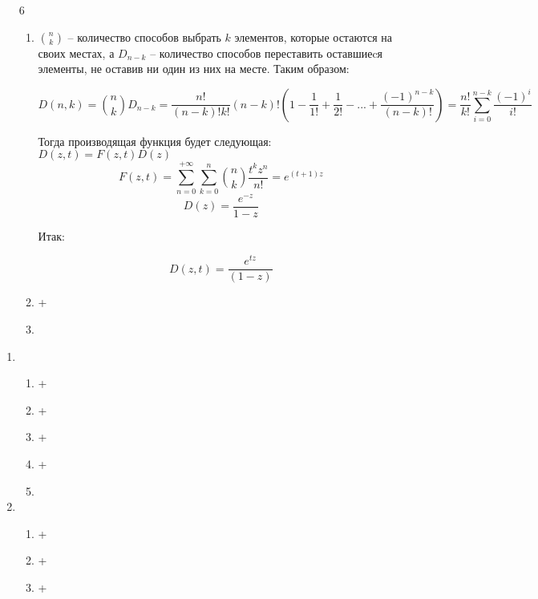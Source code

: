 \begin{enumerate}
  \item[6]
    \begin{enumerate}
      \item
      $ {n \choose k} $ -- количество способов выбрать $k$ элементов, которые остаются на своих местах, а $D_{n-k}$ -- количество способов переставить оставшиеcя элементы, не оставив ни один из них на месте. Таким образом:
      
      $$
D(n,k) = {n \choose k} D_{n-k} = \frac{n!}{(n-k)!k!} (n-k)! \left( 1 - \frac{1}{1!} + \frac{1}{2!} - ... + \frac{(-1)^{n-k}}{(n-k)!} \right) = \frac{n!}{k!} \sum\limits_{i=0}^{n-k} \frac{(-1)^i}{i!}
      $$
      
Тогда производящая функция будет следующая: $D(z,t) = F(z,t)D(z)$
$$F(z,t) = \sum\limits_{n=0}^{+\infty} \sum\limits_{k=0}^{n} {n \choose k} \frac{t^k z^n}{n!} = e^{(t+1)z}$$
$$ D(z) = \frac{e^{-z}}{1-z}
$$

Итак:

$$
D(z,t) = \frac{e^{tz}}{(1-z)}
$$
      \item +
      
      \item
    \end{enumerate}
\end{enumerate}


\begin{enumerate}
  \item
    \begin{enumerate}
      \item +
      \item +
      \item +
      \item +
      
      \item
      
    \end{enumerate}
  
  \item
    \begin{enumerate}
      \item +
      \item +
      \item +
    \end{enumerate}
\end{enumerate}

